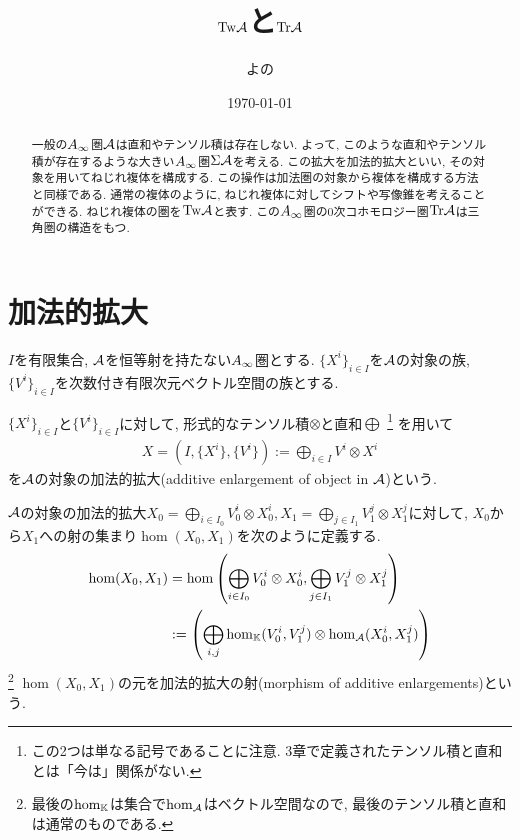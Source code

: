 \documentclass[uplatex, a4paper, 14Q, dvipdfmx]{jsarticle}
\title{\texorpdfstring{$\mathrm{Tw}\mathcal{A}$}{TwA}と\texorpdfstring{$\mathrm{Tr}{\mathcal{A}}$}{TrA}}
\author{よの}
\date{\today}
\begin{document}
\maketitle

\begin{abstract}
  一般の$A_{\infty}$圏$\A$は直和やテンソル積は存在しない. 
  よって, このような直和やテンソル積が存在するような大きい$A_{\infty}$圏$\Sigma\mathcal{A}$を考える. 
  この拡大を加法的拡大といい, その対象を用いてねじれ複体を構成する. 
  この操作は加法圏の対象から複体を構成する方法と同様である. 
  通常の複体のように, ねじれ複体に対してシフトや写像錐を考えることができる. 
  ねじれ複体の圏を$\mathrm{Tw}\mathcal{A}$と表す. 
  この$A_{\infty}$圏の$0$次コホモロジー圏$\mathrm{Tr}\mathcal{A}$は三角圏の構造をもつ. 
\end{abstract}

\tableofcontents

\section{加法的拡大}

$I$を有限集合, $\A$を恒等射を持たない$A_{\infty}$圏とする.
$\{X^i\}_{i \in I}$を$\A$の対象の族, $\{V^i\}_{i \in I}$を次数付き有限次元ベクトル空間の族とする.

\begin{definition}[$\A$の対象の加法的拡大]
  $\{X^i\}_{i \in I}$と$\{V^i\}_{i \in I}$に対して, 形式的なテンソル積$\otimes$と直和$\bigoplus$
  \footnote{
    この2つは単なる記号であることに注意. 
    3章で定義されたテンソル積と直和とは「今は」関係がない.
  }
  を用いて
  \begin{align*}
    X = (I,\{X^i\},\{V^i\}) := \bigoplus_{i \in I} V^i \otimes X^i
  \end{align*}
  を$\A$の対象の加法的拡大(additive enlargement of object in $\A$)という. 
\end{definition}

\begin{definition}[加法的拡大の射]
  $\A$の対象の加法的拡大$X_0 = \bigoplus_{i \in I_0} V_0^i \otimes X_0^i, X_1 = \bigoplus_{j \in I_1} V_1^j \otimes X_1^j$に対して, $X_0$から$X_1$への射の集まり$\hom(X_0,X_1)$を次のように定義する. 
  \begin{align*}
    \hom (X_0,X_1) 
    &= \hom \qty(\bigoplus_{i \in I_0} V_0^i \otimes X_0^i, \bigoplus_{j \in I_1} V_1^j \otimes X_1^j) \\
    &:= \qty(\bigoplus_{i,j} \hom_{\mathbb{K}}(V_0^i,V_1^j) \otimes \hom_{\mathcal{A}}(X_0^i,X_1^j))
  \end{align*}
  \footnote{
    最後の$\hom_{\mathbb{K}}$は集合で$\hom_{\mathcal{A}}$はベクトル空間なので, 最後のテンソル積と直和は通常のものである. 
  }
  $\hom (X_0,X_1)$の元を加法的拡大の射(morphism of additive enlargements)という. 
\end{definition}
\end{document}
